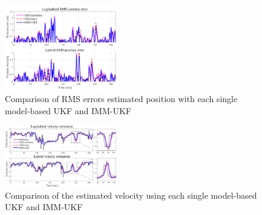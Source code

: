 \documentclass[journal]{IEEEtran}
\begin{document}
     \begin{figure}
		\centering
		\includegraphics[width=0.44\textwidth]{figures/Estimated_RMS_position_error}
		\caption{Comparison of RMS errors estimated position with each single model-based UKF and IMM-UKF}
		\label{fig:track_pos}
	\end{figure}
 	\begin{figure}
		\centering
		\includegraphics[width=0.44\textwidth]{figures/Compare_velocity_est4}
		\caption{Comparison of the estimated velocity using each single model-based UKF and IMM-UKF}
		\label{fig:track_v}
	\end{figure}   
\end{document}
